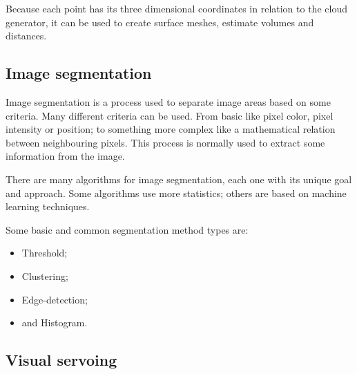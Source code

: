 Because each point has its three dimensional coordinates in relation to the cloud generator, it can be used to create surface meshes, estimate volumes and distances.


\subsection{Image segmentation}
\label{subsec:image_segmentation}

Image segmentation is a process used to separate image areas based on some criteria. Many different criteria can be used. From basic like pixel color, pixel intensity or position; to something more complex like a mathematical relation between neighbouring pixels. This process is normally used to extract some information from the image.

There are many algorithms for image segmentation, each one with its unique goal and approach. Some algorithms use more statistics; others are based on machine learning techniques.

Some basic and common segmentation method types are:

\begin{itemize}
    \item Threshold;
    \item Clustering;
    \item Edge-detection;
    \item and Histogram.
\end{itemize}


\subsection{Visual servoing}
\label{subsec:visual_servoing}


